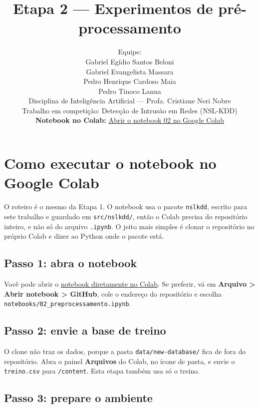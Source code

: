 \documentclass[11pt,a4paper]{article}
\title{Etapa 2 --- Experimentos de pré-processamento}
\author{Equipe:\\[2pt]
Gabriel Egídio Santos Beloni\\
Gabriel Evangelista Massara\\
Pedro Henrique Cardoso Maia\\
Pedro Tinoco Lanna\\[4pt]
\small Disciplina de Inteligência Artificial --- Profa. Cristiane Neri Nobre\\
\small Trabalho em competição: Detecção de Intrusão em Redes (NSL-KDD)\\[4pt]
\small \textbf{Notebook no Colab:} \href{https://colab.research.google.com/github/pedro-maia1337/IA-CopaLibertadores/blob/main/notebooks/02_preprocessamento.ipynb}{Abrir o notebook 02 no Google Colab}
}
\date{}
\begin{document}
\maketitle

\tableofcontents
\clearpage
\section*{Como executar o notebook no Google Colab}

O roteiro é o mesmo da Etapa 1. O notebook usa o pacote \texttt{nslkdd}, escrito para este trabalho e guardado em \texttt{src/nslkdd/}, então o Colab precisa do repositório inteiro, e não só do arquivo \texttt{.ipynb}. O jeito mais simples é clonar o repositório no próprio Colab e dizer ao Python onde o pacote está.

\begin{center}\end{center}

\subsection*{Passo 1: abra o notebook}

Você pode abrir o \href{https://colab.research.google.com/github/pedro-maia1337/IA-CopaLibertadores/blob/main/notebooks/02_preprocessamento.ipynb}{notebook diretamente no Colab}. Se preferir, vá em \textbf{Arquivo > Abrir notebook > GitHub}, cole o endereço do repositório e escolha \texttt{notebooks/02\_preprocessamento.ipynb}.

\subsection*{Passo 2: envie a base de treino}

O clone não traz os dados, porque a pasta \texttt{data/new-database/} fica de fora do repositório. Abra o painel \textbf{Arquivos} do Colab, no ícone de pasta, e envie o \texttt{treino.csv} para \texttt{/content}. Esta etapa também usa só o treino.

\subsection*{Passo 3: prepare o ambiente}
\end{document}
